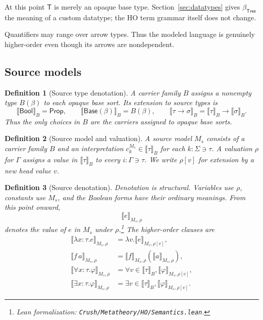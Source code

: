 \documentclass[11pt]{article}
\newtheorem{definition}{Definition}[section]
\theoremstyle{remark}
\newcommand{\leanfile}[1]{\footnote{Lean formalization: \texttt{Crush/Metatheory/#1}.}}
\newcommand{\Bool}{\mathsf{Bool}}
\newcommand{\Base}{\mathsf{Base}}
\newcommand{\den}[3]{\llbracket #1\rrbracket_{#2,#3}}
\newcommand{\Tree}{\mathsf{Tree}}
\newcommand{\TreeTy}{\mathsf{T}}
\begin{document}
At this point $\TreeTy$ is merely an opaque base type.
Section~\ref{sec:datatypes} gives $\beta_{\Tree}$ the meaning of a custom
datatype; the HO term grammar itself does not change.

Quantifiers may range over arrow types. Thus the modeled language is genuinely
higher-order even though its arrows are nondependent.

\subsection{Source models}

\begin{definition}[Source type denotation]
A carrier family $B$ assigns a nonempty type $B(\beta)$ to each opaque base
sort. Its extension to source types is
\[
 \llbracket\Bool\rrbracket_B=\mathsf{Prop},\qquad
 \llbracket\Base(\beta)\rrbracket_B=B(\beta),\qquad
 \llbracket\tau\to\sigma\rrbracket_B=
   \llbracket\tau\rrbracket_B\to\llbracket\sigma\rrbracket_B.
\]
Thus the only choices in $B$ are the carriers assigned to opaque base sorts.
\end{definition}

\begin{definition}[Source model and valuation]
A source model $M_s$ consists of a carrier family $B$ and an interpretation
$c_k^{M_s}\in\llbracket\tau\rrbracket_B$ for each
$k:\Sigma\ni\tau$. A
valuation $\rho$ for $\Gamma$ assigns a value in
$\llbracket\tau\rrbracket_B$ to every $i:\Gamma\ni\tau$. We write $\rho[v]$
for extension by a new head value $v$.
\end{definition}

\begin{definition}[Source denotation]
Denotation is structural. Variables use $\rho$, constants use $M_s$, and the
Boolean forms have their ordinary meanings. From this point onward,
\[
  \den{e}{M_s}{\rho}
\]
denotes the value of $e$ in $M_s$ under
$\rho$.\leanfile{HO/Semantics.lean} The higher-order clauses are
\[
\begin{aligned}
 \den{\lambda x{:}\tau.e}{M_s}{\rho}
   &=\lambda v.\den{e}{M_s}{\rho[v]},\\
 \den{f\,a}{M_s}{\rho}
   &=\den{f}{M_s}{\rho}(\den{a}{M_s}{\rho}),\\
 \den{\forall x{:}\tau.\varphi}{M_s}{\rho}
   &=\forall v\in\llbracket\tau\rrbracket_B,
       \den{\varphi}{M_s}{\rho[v]},\\
 \den{\exists x{:}\tau.\varphi}{M_s}{\rho}
   &=\exists v\in\llbracket\tau\rrbracket_B,
       \den{\varphi}{M_s}{\rho[v]}.
\end{aligned}
\]
\end{definition}
\end{document}
